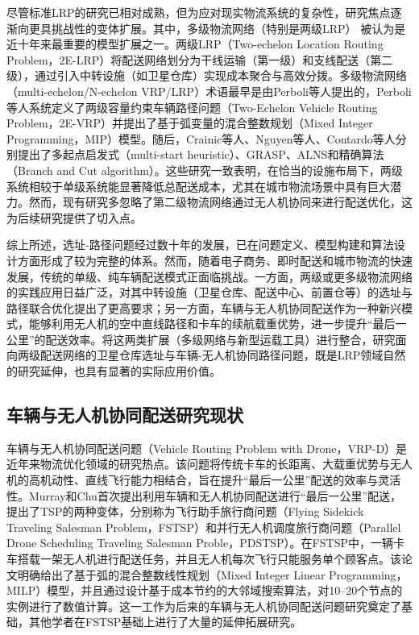 \documentclass[fontset=none]{ctexart}
\begin{document}
尽管标准LRP的研究已相对成熟，但为应对现实物流系统的复杂性，研究焦点逐渐向更具挑战性的变体扩展。其中，多级物流网络（特别是两级LRP） 被认为是近十年来最重要的模型扩展之一\cite{drexlSurveyVariantsExtensions2015}。两级LRP（Two-echelon Location Routing Problem，2E-LRP）将配送网络划分为干线运输（第一级）和支线配送（第二级），通过引入中转设施（如卫星仓库）实现成本聚合与高效分拨。多级物流网络（multi-echelon/N-echelon VRP/LRP）术语最早是由Perboli等人提出的，Perboli等人系统定义了两级容量约束车辆路径问题（Two-Echelon Vehicle Routing Problem，2E-VRP）并提出了基于弧变量的混合整数规划（Mixed Integer Programming，MIP）模型\cite{perboliTwoEchelonCapacitatedVehicle2011}。随后，Crainic等人\cite{crainicMultistartHeuristicsTwoEchelon2011}、Nguyen等人\cite{nguyenSolvingTwoechelonLocation2012, nguyenMultistartIteratedLocal2012}、Contardo等人\cite{contardoLowerUpperBounds2012}分别提出了多起点启发式（multi-start heuristic）、GRASP、ALNS和精确算法（Branch and Cut algorithm）。这些研究一致表明，在恰当的设施布局下，两级系统相较于单级系统能显著降低总配送成本，尤其在城市物流场景中具有巨大潜力。然而，现有研究多忽略了第二级物流网络通过无人机协同来进行配送优化，这为后续研究提供了切入点。

综上所述，选址-路径问题经过数十年的发展，已在问题定义、模型构建和算法设计方面形成了较为完整的体系。然而，随着电子商务、即时配送和城市物流的快速发展，传统的单级、纯车辆配送模式正面临挑战。一方面，两级或更多级物流网络的实践应用日益广泛，对其中转设施（卫星仓库、配送中心、前置仓等）的选址与路径联合优化提出了更高要求；另一方面，车辆与无人机协同配送作为一种新兴模式，能够利用无人机的空中直线路径和卡车的续航载重优势，进一步提升“最后一公里”的配送效率。将这两类扩展（多级网络与新型运载工具）进行整合，研究面向两级配送网络的卫星仓库选址与车辆-无人机协同路径问题，既是LRP领域自然的研究延伸，也具有显著的实际应用价值。

\subsection{车辆与无人机协同配送研究现状}

车辆与无人机协同配送问题（Vehicle Routing Problem with Drone，VRP-D）是近年来物流优化领域的研究热点。该问题将传统卡车的长距离、大载重优势与无人机的高机动性、直线飞行能力相结合，旨在提升“最后一公里”配送的效率与灵活性。Murray和Chu首次提出利用车辆和无人机协同配送进行“最后一公里”配送\cite{murrayFlyingSidekickTraveling2015}，提出了TSP的两种变体，分别称为飞行助手旅行商问题（Flying Sidekick Traveling Salesman Problem，FSTSP）和并行无人机调度旅行商问题（Parallel Drone Scheduling Traveling Salesman Proble，PDSTSP）。在FSTSP中，一辆卡车搭载一架无人机进行配送任务，并且无人机每次飞行只能服务单个顾客点。该论文明确给出了基于弧的混合整数线性规划（Mixed Integer Linear Programming，MILP）模型，并且通过设计基于成本节约的大邻域搜索算法，对10--20个节点的实例进行了数值计算。这一工作为后来的车辆与无人机协同配送问题研究奠定了基础，其他学者在FSTSP基础上进行了大量的延伸拓展研究。
\end{document}
